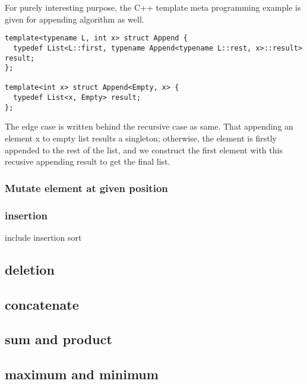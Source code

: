 \documentclass{article}
\begin{document}
For purely interesting purpose, the C++ template meta programming example is given for appending algorithm
as well.

\begin{lstlisting}
template<typename L, int x> struct Append {
  typedef List<L::first, typename Append<typename L::rest, x>::result> result;
};

template<int x> struct Append<Empty, x> {
  typedef List<x, Empty> result;
};
\end{lstlisting}

The edge case is written behind the recursive case as same. That appending an element x to empty list
results a singleton; otherwise, the element is firstly appended to the rest of the list, and we
construct the first element with this recusive appending result to get the final list.

\subsubsection{Mutate element at given position}

\subsubsection{insertion}

include insertion sort

\subsection{deletion}

\subsection{concatenate}

\subsection{sum and product}

\subsection{maximum and minimum}
\end{document}
